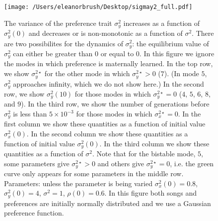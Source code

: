 \documentclass{article}
\begin{document}
\begin{figure}
\texttt{[image: /Users/eleanorbrush/Desktop/sigmay2\_full.pdf]}
\caption{\label{sigmay2_full} The variance of the preference trait $\sigma_y^{2}$ increases as a function of $\sigma_y^2(0)$ and decreases or is non-monotonic as a function of $\sigma^2$. There are two possibilites for the dynamics of $\sigma_y^2$: the equilibrium value of $\sigma_y^2$ can either be greater than $0$ or equal to $0$. In this figure we ignore the modes in which preference is maternally learned. In the top row, we show $\sigma_y^{2\star}$ for the other mode in which $\sigma_y^{2\star}>0$ ($7$). (In mode $5$, $\sigma_y^2$ approaches infinity, which we do not show here.) In the second row, we show $\sigma_y^2(10)$  for those modes in which $\sigma_y^{2\star}=0$ ($4$, $5$, $6$, $8$, and $9$). In the third row, we show the number of generations before $\sigma_y^2$ is less than $5\times10^{-3}$ for those modes in which $\sigma_x^{2\star}=0$. In the first column we show these quantities as a function of initial value $\sigma_x^{2}(0)$. In the second column we show these quantities as a function of initial value $\sigma_y^2(0)$. In the third column we show these quantities as a function of $\sigma^2$. Note that for the bistable mode, $5$, some parameters give $\sigma_y^{2\star}>0$ and others give $\sigma_y^{2\star}=0$, i.e. the green curve only appears for some parameters in the middle row.  Parameters: unless the parameter is being varied $\sigma_x^2(0)=0.8$, $\sigma_y^2(0)=4$, $\sigma^2=1$, $\rho(0)=0.6$. In this figure both songs and preferences are initially normally distributed and we use a Gaussian preference function.}
\end{figure}
\end{document}
